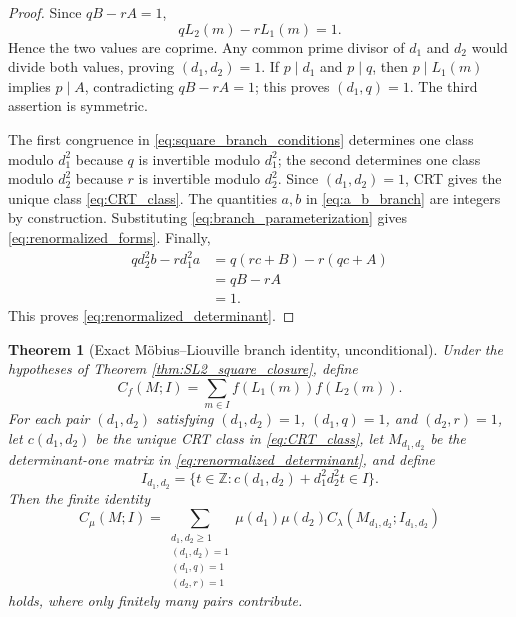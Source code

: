 \documentclass[11pt]{amsart}
\numberwithin{equation}{section}
\theoremstyle{plain}
\newtheorem{theorem}{Theorem}[section]
\theoremstyle{definition}
\theoremstyle{remark}
\newcommand{\Z}{\mathbb Z}
\newcommand{\mob}{\mu}
\newcommand{\liou}{\lambda}
\begin{document}
\begin{proof}
Since $qB-rA=1$,
\begin{equation}
qL_2(m)-rL_1(m)=1.
\label{eq:branch_bezout}
\end{equation}
Hence the two values are coprime.  Any common prime divisor of $d_1$ and $d_2$ would divide both values, proving $(d_1,d_2)=1$.  If $p\mid d_1$ and $p\mid q$, then $p\mid L_1(m)$ implies $p\mid A$, contradicting $qB-rA=1$; this proves $(d_1,q)=1$.  The third assertion is symmetric.

The first congruence in \eqref{eq:square_branch_conditions} determines one class modulo $d_1^2$ because $q$ is invertible modulo $d_1^2$; the second determines one class modulo $d_2^2$ because $r$ is invertible modulo $d_2^2$.  Since $(d_1,d_2)=1$, CRT gives the unique class \eqref{eq:CRT_class}.  The quantities $a,b$ in \eqref{eq:a_b_branch} are integers by construction.  Substituting \eqref{eq:branch_parameterization} gives \eqref{eq:renormalized_forms}.  Finally,
\begin{align}
qd_2^2b-rd_1^2a
&=q(rc+B)-r(qc+A)
\label{eq:determinant_branch_first}\\
&=qB-rA
\label{eq:determinant_branch_second}\\
&=1.
\label{eq:determinant_branch_final}
\end{align}
This proves \eqref{eq:renormalized_determinant}.
\end{proof}

\begin{theorem}[Exact Möbius--Liouville branch identity, unconditional]
\label{thm:exact_branch_identity}
Under the hypotheses of Theorem \ref{thm:SL2_square_closure}, define
\begin{equation}
C_f(M;I)=\sum_{m\in I}f(L_1(m))f(L_2(m)).
\label{eq:Cf_definition}
\end{equation}
For each pair $(d_1,d_2)$ satisfying $(d_1,d_2)=1$, $(d_1,q)=1$, and $(d_2,r)=1$, let $c(d_1,d_2)$ be the unique CRT class in \eqref{eq:CRT_class}, let $M_{d_1,d_2}$ be the determinant-one matrix in \eqref{eq:renormalized_determinant}, and define
\begin{equation}
I_{d_1,d_2}
=\{t\in\Z:c(d_1,d_2)+d_1^2d_2^2t\in I\}.
\label{eq:branch_interval}
\end{equation}
Then the finite identity
\begin{equation}
C_{\mob}(M;I)
=
\sum_{\substack{d_1,d_2\ge1\\(d_1,d_2)=1\\(d_1,q)=1\\(d_2,r)=1}}
\mob(d_1)\mob(d_2)
C_{\liou}(M_{d_1,d_2};I_{d_1,d_2})
\label{eq:exact_mu_lambda_branch_identity}
\end{equation}
holds, where only finitely many pairs contribute.
\end{theorem}
\end{document}
